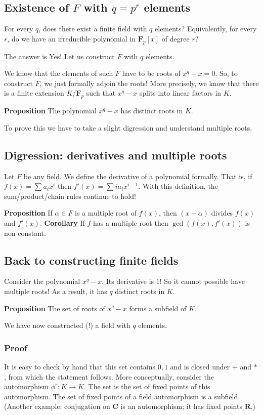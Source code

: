 \documentclass[11pt]{article}
\begin{document}
\subsection{Existence of \(F\) with \(q = p^{r}\) elements}
\label{sec:orgb945beb}
For every \(q\), does there exist a finite field with \(q\) elements?
Equivalently, for every \(r\), do we have an irreducible polynomial in \(\mathbf{F}_p[x]\) of degree \(r\)?

The answer is Yes!
Let us construct \(F\) with \(q\) elements.

We know that the elements of such \(F\) have to be roots of \(x^q-x = 0\).
So, to construct \(F\), we just formally adjoin the roots!
More precisely, we know that there is a finite extension \(K / \mathbf{F}_p\) such that \(x^q-x\) splits into linear factors in \(K\).

\textbf{\textbf{Proposition}} The polynomial \(x^q-x\) has distinct roots in \(K\).

To prove this we have to take a slight digression and understand multiple roots.
\subsection{Digression: derivatives and multiple roots}
\label{sec:orga189cec}
Let \(F\) be any field.
We define the derivative of a polynomial formally.
That is, if \(f(x) = \sum a_i x^{i}\) then \(f'(x) = \sum i a_i x^{i-1}.\)
With this definition, the sum/product/chain rules continue to hold!

\textbf{\textbf{Proposition}} If \(\alpha \in F\) is a multiple root of \(f(x)\), then \((x-\alpha)\) divides \(f(x)\) and \(f'(x)\).
\textbf{\textbf{Corollary}} If \(f\) has a multiple root then \(\gcd(f(x), f'(x))\) is non-constant.
\subsection{Back to constructing finite fields}
\label{sec:org74b187a}
Consider the polynomial \(x^q - x\).
Its derivative is \(1\)!
So it cannot possible have multiple roots!
As a result, it has \(q\) distinct roots in \(K\).

\textbf{\textbf{Proposition}} The set of roots of \(x^q-x\) forms a subfield of \(K\).

We have now constructed (!) a field with \(q\) elements.
\subsubsection{Proof}
\label{sec:orgfeacb82}
It is easy to check by hand that this set contains \(0,1\) and is closed under \(+\) and \(*\), from which the statement follows.
More conceptually, consider the automorphism \(\phi^r \colon K \to K\).  The set is the set of fixed points of this automorphism.
The set of fixed points of a field automorphism is a subfield.
(Another example: conjugation on \(\mathbf{C}\) is an automorphism; it has fixed points \(\mathbf{R}\).)
\end{document}
